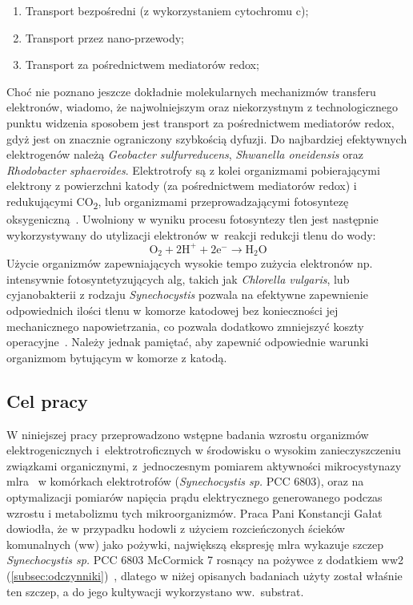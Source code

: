 \begin{enumerate}
    \item Transport bezpośredni (z wykorzystaniem cytochromu c);
    \item Transport przez nano-przewody;
    \item Transport za pośrednictwem mediatorów redox;
\end{enumerate}

Choć nie poznano jeszcze dokładnie molekularnych mechanizmów
transferu elektronów, wiadomo, że najwolniejszym oraz
niekorzystnym z technologicznego punktu widzenia sposobem jest
transport za pośrednictwem mediatorów redox, gdyż jest on znacznie
ograniczony szybkością dyfuzji.
Do najbardziej efektywnych elektrogenów należą
\textit{Geobacter sulfurreducens}, \textit{Shwanella oneidensis}
oraz \textit{Rhodobacter sphaeroides}.
Elektrotrofy są z kolei organizmami pobierającymi elektrony
z powierzchni katody (za pośrednictwem mediatorów redox)
i redukującymi CO\textsubscript{2}, lub organizmami przeprowadzającymi fotosyntezę
oksygeniczną~\cite{Santoro2017, Reddy2019}.
Uwolniony w wyniku procesu fotosyntezy tlen jest następnie wykorzystywany
do utylizacji elektronów w~reakcji redukcji tlenu do wody:
\begin{equation}
    \label{eq:2}
    \mathrm{O_2 + 2H^+ + 2e^- \rightarrow H_2 O}
\end{equation}
Użycie organizmów zapewniających wysokie tempo zużycia elektronów np.
intensywnie fotosyntetyzujących alg, takich jak \textit{Chlorella vulgaris},
lub cyjanobakterii z rodzaju \textit{Synechocystis} pozwala na efektywne
zapewnienie odpowiednich ilości tlenu w komorze katodowej bez
konieczności jej mechanicznego napowietrzania, co pozwala dodatkowo
zmniejszyć koszty operacyjne~\cite{Reddy2019}.
Należy jednak pamiętać, aby zapewnić odpowiednie warunki
organizmom bytującym w komorze z katodą.

\subsection{Cel pracy}\label{subsec:badania}
W niniejszej pracy przeprowadzono wstępne badania wzrostu organizmów
elektrogenicznych i~elektrotroficznych
w środowisku o wysokim zanieczyszczeniu związkami
organicznymi, z~jednoczesnym pomiarem aktywności mikrocystynazy
\acrshort{mlra}~\cite{Dexter2018, Dexter2021} w komórkach elektrotrofów
(\textit{Synechocystis sp.} PCC 6803),
oraz na optymalizacji pomiarów napięcia prądu elektrycznego generowanego
podczas wzrostu i metabolizmu tych mikroorganizmów.
Praca Pani Konstancji Gałat dowiodła, że w przypadku
hodowli z użyciem rozcieńczonych ścieków komunalnych (\acrshort{ww})
jako pożywki, największą ekspresję \acrshort{mlra} wykazuje szczep
\textit{Synechocystis sp.} PCC 6803 McCormick 7 rosnący na pożywce
z dodatkiem \acrshort{ww}2 (\ref{subsec:odczynniki})~\cite{Galat2022},
dlatego w niżej opisanych badaniach użyty został właśnie ten szczep,
a do jego kultywacji wykorzystano ww.\ substrat.